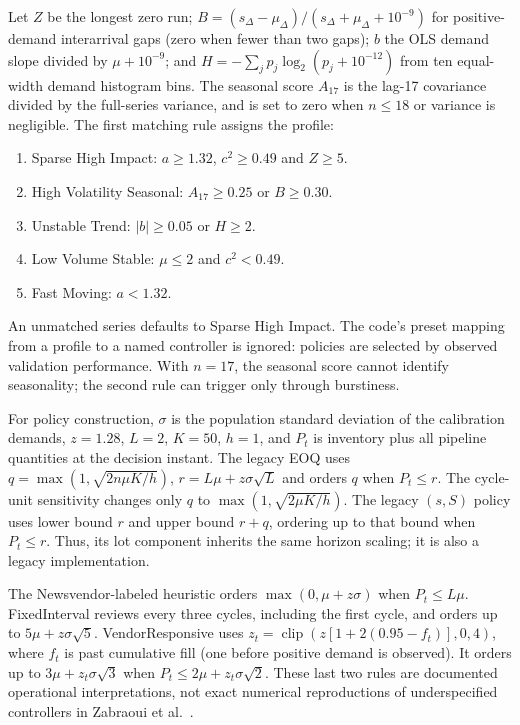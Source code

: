 \documentclass[preprint,12pt]{elsarticle}
\begin{document}
Let $Z$ be the longest zero run; $B=(s_\Delta-\mu_\Delta)/(s_\Delta+\mu_\Delta+10^{-9})$ for positive-demand interarrival gaps (zero when fewer than two gaps); $b$ the OLS demand slope divided by $\mu+10^{-9}$; and $H=-\sum_j p_j\log_2(p_j+10^{-12})$ from ten equal-width demand histogram bins. The seasonal score $A_{17}$ is the lag-17 covariance divided by the full-series variance, and is set to zero when $n\leq18$ or variance is negligible. The first matching rule assigns the profile:
\begin{enumerate}
\item Sparse High Impact: $a\geq1.32$, $c^2\geq0.49$ and $Z\geq5$.
\item High Volatility Seasonal: $A_{17}\geq0.25$ or $B\geq0.30$.
\item Unstable Trend: $|b|\geq0.05$ or $H\geq2$.
\item Low Volume Stable: $\mu\leq2$ and $c^2<0.49$.
\item Fast Moving: $a<1.32$.
\end{enumerate}
An unmatched series defaults to Sparse High Impact. The code's preset mapping from a profile to a named controller is ignored: policies are selected by observed validation performance. With $n=17$, the seasonal score cannot identify seasonality; the second rule can trigger only through burstiness.

For policy construction, $\sigma$ is the population standard deviation of the calibration demands, $z=1.28$, $L=2$, $K=50$, $h=1$, and $P_t$ is inventory plus all pipeline quantities at the decision instant. The legacy EOQ uses $q=\max(1,\sqrt{2n\mu K/h})$, $r=L\mu+z\sigma\sqrt L$ and orders $q$ when $P_t\leq r$. The cycle-unit sensitivity changes only $q$ to $\max(1,\sqrt{2\mu K/h})$. The legacy $(s,S)$ policy uses lower bound $r$ and upper bound $r+q$, ordering up to that bound when $P_t\leq r$. Thus, its lot component inherits the same horizon scaling; it is also a legacy implementation.

The Newsvendor-labeled heuristic orders $\max(0,\mu+z\sigma)$ when $P_t\leq L\mu$. FixedInterval reviews every three cycles, including the first cycle, and orders up to $5\mu+z\sigma\sqrt5$. VendorResponsive uses $z_t=\operatorname{clip}(z[1+2(0.95-f_t)],0,4)$, where $f_t$ is past cumulative fill (one before positive demand is observed). It orders up to $3\mu+z_t\sigma\sqrt3$ when $P_t\leq2\mu+z_t\sigma\sqrt2$. These last two rules are documented operational interpretations, not exact numerical reproductions of underspecified controllers in Zabraoui et al.\ \cite{sca_27e994c54848}.
\end{document}
